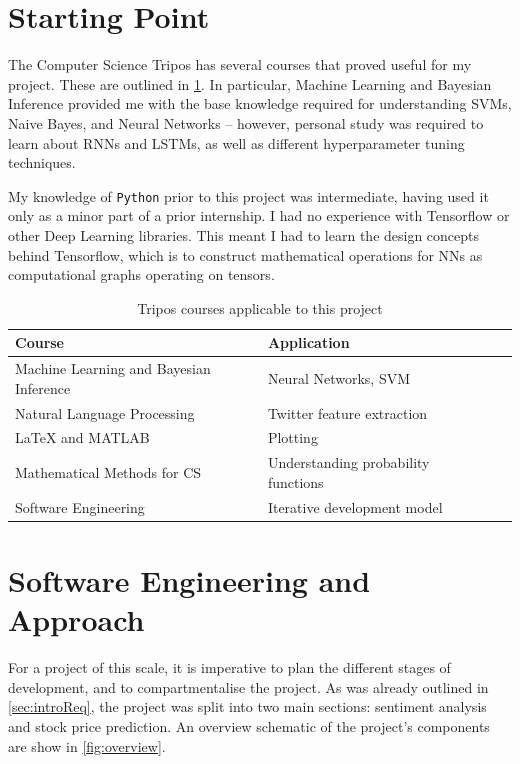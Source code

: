 \documentclass[12pt,a4paper,twoside,openright]{report}
\begin{document}
\section{Starting Point}
\label{sec:introStart}

The Computer Science Tripos has several courses that proved useful for my project.
These are outlined in \cref{table:courses}. In particular, Machine Learning and
Bayesian Inference provided me with the base knowledge required for understanding
SVMs, Naive Bayes, and Neural Networks -- however, personal study was required to
learn about RNNs and LSTMs, as well as different hyperparameter tuning techniques.

My knowledge of \texttt{Python} prior to this project was intermediate, having used it
only as a minor part of a prior internship. I had no experience with Tensorflow
or other Deep Learning libraries. This meant I had to learn the design concepts
behind Tensorflow, which is to construct mathematical operations for NNs as
computational graphs operating on tensors. 

\begin{table}[H]
\centering
\begin{tabular}{llll}
\toprule
\textbf{Course}                              & \textbf{Application} \\ \midrule
Machine Learning and Bayesian Inference      &  Neural Networks, SVM                    \\
Natural Language Processing                  &  Twitter feature extraction                    \\
LaTeX and MATLAB                             &  Plotting       \\
Mathematical Methods for CS    &  Understanding probability functions            \\
Software Engineering                         &  Iterative development model                    \\\bottomrule
\end{tabular}
\caption{Tripos courses applicable to this project}
\label{table:courses}
\end{table}

\section{Software Engineering and Approach}
\label{sec:introImpl}

For a project of this scale, it is imperative to plan the different stages of
development, and to compartmentalise the project. As was already outlined in \cref{sec:introReq},
the project was split into two main sections: sentiment analysis and stock price prediction. An
overview schematic of the project's components are show in \cref{fig:overview}.
\end{document}
